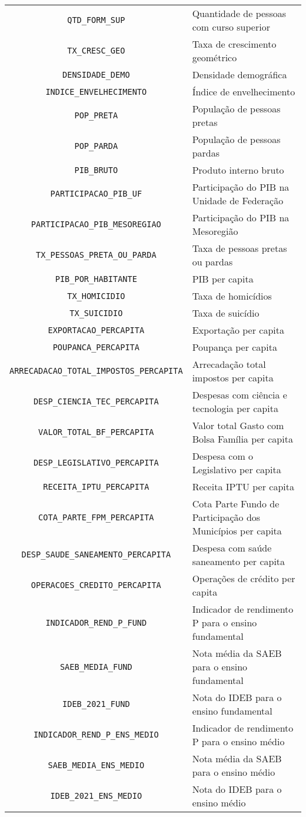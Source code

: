\documentclass[thmsa,11pt]{article}
\begin{document}
\begin{table}[htb!]
\begin{tabular}{|c|l|}
		\verb|QTD_FORM_SUP| & Quantidade de pessoas com curso superior \\
		\verb|TX_CRESC_GEO| & Taxa de crescimento geométrico\\
		\verb|DENSIDADE_DEMO| & Densidade demográfica \\
		\verb|INDICE_ENVELHECIMENTO| & Índice de envelhecimento \\
		\verb|POP_PRETA| & População de pessoas pretas\\
		\verb|POP_PARDA| & População de pessoas pardas \\
		\verb|PIB_BRUTO| & Produto interno bruto\\
		\verb|PARTICIPACAO_PIB_UF| & Participação do PIB na Unidade de Federação\\
		\verb|PARTICIPACAO_PIB_MESOREGIAO| & Participação do PIB na Mesoregião \\
		\verb|TX_PESSOAS_PRETA_OU_PARDA| & Taxa de pessoas pretas ou pardas \\
		\verb|PIB_POR_HABITANTE| & PIB per capita\\
		\verb|TX_HOMICIDIO| & Taxa de homicídios\\
		\verb|TX_SUICIDIO| & Taxa de suicídio\\
		\verb|EXPORTACAO_PERCAPITA| & Exportação per capita\\
		\verb|POUPANCA_PERCAPITA| & Poupança per capita\\
		\verb|ARRECADACAO_TOTAL_IMPOSTOS_PERCAPITA| & Arrecadação total impostos per capita\\
		\verb|DESP_CIENCIA_TEC_PERCAPITA| & Despesas com ciência e tecnologia per capita\\
		\verb|VALOR_TOTAL_BF_PERCAPITA| & Valor total Gasto com Bolsa Família per capita\\
		\verb|DESP_LEGISLATIVO_PERCAPITA| & Despesa com o Legislativo per capita \\
		\verb|RECEITA_IPTU_PERCAPITA| & Receita IPTU per capita\\
		\verb|COTA_PARTE_FPM_PERCAPITA| & Cota Parte Fundo de Participação dos Municípios per capita \\
		\verb|DESP_SAUDE_SANEAMENTO_PERCAPITA| & Despesa com saúde saneamento per capita\\
		\verb|OPERACOES_CREDITO_PERCAPITA| & Operações de crédito per capita\\
		\verb|INDICADOR_REND_P_FUND| & Indicador de rendimento P para o ensino fundamental\\
		\verb|SAEB_MEDIA_FUND| & Nota média da SAEB para o ensino fundamental\\
		\verb|IDEB_2021_FUND| & Nota do IDEB para o ensino fundamental\\
		\verb|INDICADOR_REND_P_ENS_MEDIO| & Indicador de rendimento P para o ensino médio\\
		\verb|SAEB_MEDIA_ENS_MEDIO| & Nota média da SAEB para o ensino médio\\
		\verb|IDEB_2021_ENS_MEDIO| & Nota do IDEB para o ensino médio\\
		\hline
	\end{tabular}
\end{table}
\end{document}
